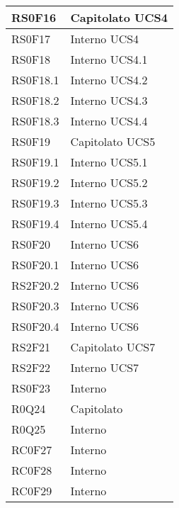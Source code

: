 \begin{center}
\begin{longtable}{|p{5cm}|p{5cm}|}
RS0F16		& Capitolato \newline UCS4 \\\hline
RS0F17		& Interno \newline UCS4 \\\hline
RS0F18		& Interno \newline UCS4.1 \\\hline
RS0F18.1	& Interno \newline UCS4.2 \\\hline
RS0F18.2	& Interno \newline UCS4.3 \\\hline
RS0F18.3	& Interno \newline UCS4.4 \\\hline
RS0F19		& Capitolato \newline UCS5 \\\hline
RS0F19.1	& Interno \newline UCS5.1 \\\hline
RS0F19.2	& Interno \newline UCS5.2 \\\hline
RS0F19.3	& Interno \newline UCS5.3 \\\hline
RS0F19.4	& Interno \newline UCS5.4 \\\hline
RS0F20		& Interno \newline UCS6 \\\hline
RS0F20.1		& Interno \newline UCS6 \\\hline
RS2F20.2		& Interno \newline UCS6 \\\hline
RS0F20.3		& Interno \newline UCS6 \\\hline
RS0F20.4		& Interno \newline UCS6 \\\hline
RS2F21		& Capitolato \newline UCS7 \\\hline
RS2F22		& Interno \newline UCS7 \\\hline
RS0F23		& Interno \\\hline
R0Q24		& Capitolato \\\hline
R0Q25		& Interno \\\hline
RC0F27		& Interno \\\hline
RC0F28		& Interno \\\hline
RC0F29		& Interno \\\hline

\end{longtable}
\end{center}
